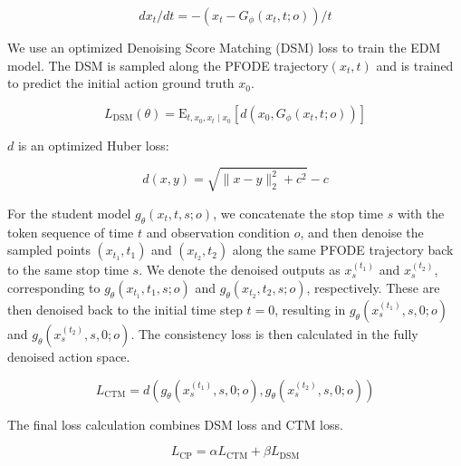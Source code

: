 \begin{equation}
dx_t/dt = -(x_t - G_\phi(x_t, t; o))/t
\end{equation}

We use an optimized Denoising Score Matching (DSM) loss to train the EDM model. The DSM is sampled along the PFODE trajectory$(x_t, t)$ and is trained to predict the initial action ground truth $x_0$.

\begin{equation}
L_{\text{DSM}}(\theta) = \mathrm{E}_{t, x_0, x_t \mid x_0} \left[ d(x_0, G_\phi(x_t, t; o)) \right]
\end{equation}

$d$ is an optimized Huber loss:

\begin{equation}
d(x, y) = \sqrt{\|x - y\|_2^2 + c^2} - c
\end{equation}

For the student model $g_\theta(x_t, t, s; o)$, we concatenate the stop time $s$ with the token sequence of time $t$ and observation condition $o$, and then denoise the sampled points $(x_{t_1}, {t_1})$ and $(x_{t_2}, {t_2})$ along the same PFODE trajectory back to the same stop time $s$. We denote the denoised outputs as $x_s^{(t_1)}$ and $x_s^{(t_2)}$, corresponding to $g_\theta(x_{t_1}, t_1, s; o)$ and $g_\theta(x_{t_2}, t_2, s; o)$, respectively. These are then denoised back to the initial time step $t=0$, resulting in $g_\theta(x_s^{(t_1)}, s, 0; o)$ and $g_\theta(x_s^{(t_2)}, s, 0; o)$. The consistency loss is then calculated in the fully denoised action space.



\begin{equation}
L_{\text{CTM}} = d\left(g_\theta(x_s^{(t_1)}, s, 0; o), g_\theta(x_s^{(t_2)}, s, 0; o)\right)
\end{equation}

The final loss calculation combines DSM loss and CTM loss.

\begin{equation}
L_{\text{CP}} = \alpha L_{\text{CTM}} + \beta L_{\text{DSM}}
\end{equation}


